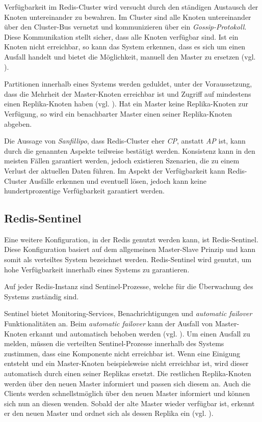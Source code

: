Verfügbarkeit im \acs{Redis}-Cluster wird versucht durch den ständigen Austausch der Knoten untereinander zu bewahren. Im Cluster sind alle Knoten untereinander über den Cluster-Bus vernetzt und kommunizieren über ein \textit{Gossip-Protokoll}. Diese Kommunikation stellt sicher, dass alle Knoten verfügbar sind. Ist ein Knoten nicht erreichbar, so kann das System erkennen, dass es sich um einen Ausfall handelt und bietet die Möglichkeit, manuell den Master zu ersetzen (vgl. \cite{Redis-Cluster-Spec}).

Partitionen innerhalb eines Systems werden geduldet, unter der Voraussetzung, dass die Mehrheit der Master-Knoten erreichbar ist und Zugriff auf mindestens einen Replika-Knoten haben (vgl. \cite{Redis-Cluster-Spec}). Hat ein Master keine Replika-Knoten zur Verfügung, so wird ein benachbarter Master einen seiner Replika-Knoten abgeben.

Die Aussage von \textit{Sanfillipo}, dass \acs{Redis}-Cluster eher \textit{CP}, anstatt \textit{AP} ist, kann durch die genannten Aspekte teilweise bestätigt werden. Konsistenz kann in den meisten Fällen garantiert werden, jedoch existieren Szenarien, die zu einem Verlust der aktuellen Daten führen. Im Aspekt der Verfügbarkeit kann \acs{Redis}-Cluster Ausfälle erkennen und eventuell lösen, jedoch kann keine hundertprozentige Verfügbarkeit garantiert werden.

\subsection{Redis-Sentinel}
Eine weitere Konfiguration, in der \acs{Redis} genutzt werden kann, ist \acs{Redis}-Sentinel. Diese Konfiguration basiert auf dem allgemeinen Master-Slave Prinzip und kann somit als verteiltes System bezeichnet werden. \acs{Redis}-Sentinel wird genutzt, um hohe Verfügbarkeit innerhalb eines Systems zu garantieren. 

Auf jeder \acs{Redis}-Instanz sind Sentinel-Prozesse, welche für die Überwachung des Systems zuständig sind. 

Sentinel bietet Monitoring-Services, Benachrichtigungen und \textit{automatic failover} Funktionalitäten an. Beim \textit{automatic failover} kann der Ausfall von Master-Knoten erkannt und automatisch behoben werden (vgl. \cite{Redis-Sentinal}).
Um einen Ausfall zu melden, müssen die verteilten Sentinel-Prozesse innerhalb des Systems zustimmen, dass eine Komponente nicht erreichbar ist. Wenn eine Einigung entsteht und ein Master-Knoten beispielsweise nicht erreichbar ist, wird dieser automatisch durch einen seiner Replikas ersetzt.  Die restlichen Replika-Knoten werden über den neuen Master informiert und passen sich diesem an. Auch die Clients werden schnellstmöglich über den neuen Master informiert und können sich nun an diesen wenden. Sobald der alte Master wieder verfügbar ist, erkennt er den neuen Master und ordnet sich als dessen Replika ein (vgl. \cite{Redis-Sentinal}).

